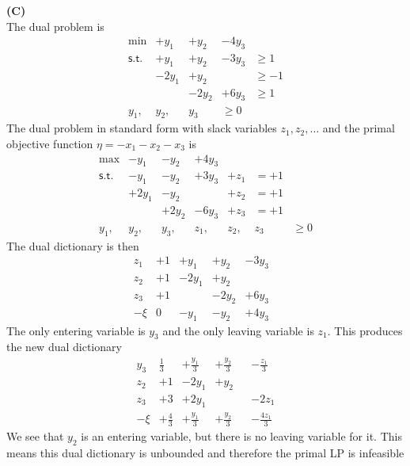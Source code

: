 \documentclass[11pt]{article}
\begin{document}
\medskip

\noindent\textbf{(C)}
\\
The dual problem is
\[\begin{array}{rllllll}
\min & +y_1 & +y_2 & -4y_3 \\
\mathsf{s.t.}
& +y_1 & +y_2 & -3y_3 & \geq 1 \\
& -2y_1 & +y_2 & & \geq -1 \\
& & -2y_2 & +6y_3 & \geq 1 \\
y_1, & y_2, & y_3 & \geq 0
\end{array}\]
The dual problem in standard form with slack variables $z_1, z_2, \ldots$ and the primal objective function $\eta = -x_1 - x_2 - x_3$ is
\[\begin{array}{rllllll}
\max & -y_1 & -y_2 & +4y_3 \\
\mathsf{s.t.}
& -y_1 & -y_2 & +3y_3 & +z_1 & = +1 \\
& +2y_1 & -y_2 & & +z_2 & = +1 \\
& & +2y_2 & -6y_3 & +z_3 & = +1 \\
y_1, & y_2, & y_3, & z_1, & z_2, & z_3 & \geq 0
\end{array}\]
The dual dictionary is then
\[\begin{array}{r|cccccccc}
z_1 & +1 & +y_1 & +y_2 & -3y_3 \\
z_2 & +1 & -2y_1 & +y_2 & & \\
z_3 & +1 & & -2y_2 & +6y_3 \\
\hline
-\xi & 0 & -y_1 & -y_2 & +4y_3
\end{array}\]
The only entering variable is $y_3$ and the only leaving variable is $z_1$.  This produces the new dual dictionary
\[\begin{array}{r|cccccccc}
y_3 & \frac{1}{3} & +\frac{y_1}{3} & +\frac{y_2}{3} & & -\frac{z_1}{3}\\
z_2 & +1 & -2y_1 & +y_2 & & \\
z_3 & +3 & +2y_1 & & & -2z_1 \\
\hline
-\xi & +\frac{4}{3} & +\frac{y_1}{3} & +\frac{y_2}{3} & & -\frac{4z_1}{3}
\end{array}\]
We see that $y_2$ is an entering variable, but there is no leaving variable for it.  This means this dual dictionary is unbounded and therefore the primal LP is infeasible
\bigskip
\end{document}
